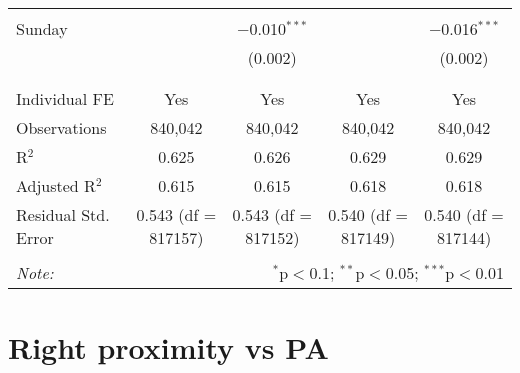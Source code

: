 \documentclass[
]{article}
\begin{document}
\begin{table}[!htbp]
{\begin{tabular}{@{\extracolsep{5pt}}lcccc}
  & & & & \\ 
 Sunday &  & $-$0.010$^{***}$ &  & $-$0.016$^{***}$ \\ 
  &  & (0.002) &  & (0.002) \\ 
  & & & & \\ 
\hline \\[-1.8ex] 
Individual FE & Yes & Yes & Yes & Yes \\ 
Observations & 840,042 & 840,042 & 840,042 & 840,042 \\ 
R$^{2}$ & 0.625 & 0.626 & 0.629 & 0.629 \\ 
Adjusted R$^{2}$ & 0.615 & 0.615 & 0.618 & 0.618 \\ 
Residual Std. Error & 0.543 (df = 817157) & 0.543 (df = 817152) & 0.540 (df = 817149) & 0.540 (df = 817144) \\ 
\hline 
\hline \\[-1.8ex] 
\textit{Note:}  & \multicolumn{4}{r}{$^{*}$p$<$0.1; $^{**}$p$<$0.05; $^{***}$p$<$0.01} \\ 
\end{tabular}
} 
\end{table} 
\newpage
\section{Right proximity vs PA}
\end{document}
